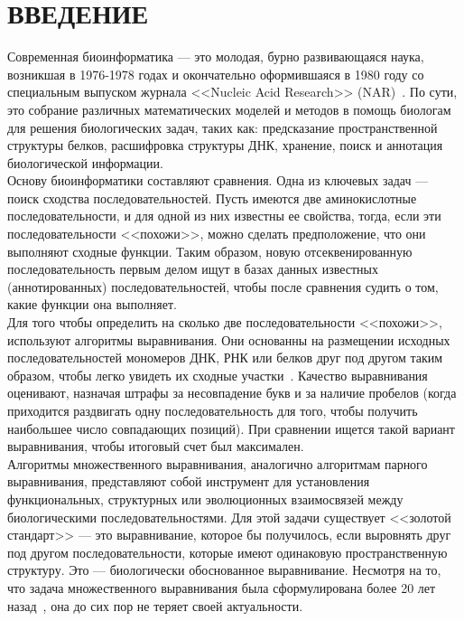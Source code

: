 \newpage
\part*{\large \centering ВВЕДЕНИЕ}
\hspace{\parindent} Современная биоинформатика --- это молодая, бурно развивающаяся наука, возникшая в 1976-1978 годах и окончательно оформившаяся в 1980 году со специальным выпуском журнала <<Nucleic Acid Research>> (NAR)~\cite{MironovLect}. По сути, это собрание различных математических моделей и методов в помощь биологам для решения биологических задач, таких как: предсказание пространственной структуры белков, расшифровка структуры ДНК, хранение, поиск и аннотация биологической информации.\\
\indent Основу биоинформатики составляют сравнения. Одна из ключевых задач --- поиск сходства последовательностей. Пусть имеются две аминокислотные последовательности, и для одной из них известны ее свойства, тогда, если эти последовательности <<похожи>>, можно сделать предположение, что они выполняют сходные функции. Таким образом, новую отсеквенированную последовательность первым делом ищут в базах данных известных (аннотированных) последовательностей, чтобы после сравнения судить о том, какие функции она выполняет.\\
\indent Для того чтобы определить на сколько две последовательности <<похожи>>, используют алгоритмы выравнивания. Они основанны на размещении исходных последовательностей мономеров ДНК, РНК или белков друг под другом таким образом, чтобы легко увидеть их сходные участки~\cite{WikiPairAlign}. Качество выравнивания оценивают, назначая штрафы за несовпадение букв и за наличие пробелов (когда приходится раздвигать одну последовательность для того, чтобы получить наибольшее число совпадающих позиций). При сравнении ищется такой вариант выравнивания, чтобы итоговый счет был максимален.\\ 
\indent Алгоритмы множественного выравнивания, аналогично алгоритмам парного выравнивания, представляют собой инструмент для установления функциональных, структурных или эволюционных взаимосвязей между биологическими последовательностями. Для этой задачи существует <<золотой стандарт>> --- это выравнивание, которое бы получилось, если выровнять друг под другом последовательности, которые имеют одинаковую пространственную структуру. Это --- биологически обоснованное выравнивание. Несмотря на то, что задача множественного выравнивания была сформулирована более 20 лет назад~\cite{SIAM_Journal}, она до сих пор не теряет своей актуальности. 
\hspace{\parindent}